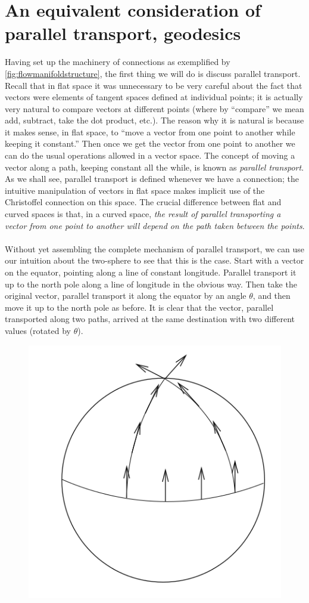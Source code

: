 \section{An equivalent consideration of parallel transport, geodesics}
Having set up the machinery of connections as exemplified by \ref{fig:flowmanifoldstructure}, the first thing we will do is discuss parallel
transport. Recall that in flat space it was unnecessary to be very careful about the fact
that vectors were elements of tangent spaces defined at individual points; it is actually very
natural to compare vectors at different points (where by “compare” we mean add, subtract,
take the dot product, etc.). The reason why it is natural is because it makes sense, in flat
space, to “move a vector from one point to another while keeping it constant.” Then once
we get the vector from one point to another we can do the usual operations allowed in a
vector space. The concept of moving a vector along a path, keeping constant all the while, is known
as \emph{parallel transport}. As we shall see, parallel transport is defined whenever we have a connection; the intuitive manipulation of vectors in flat space makes implicit use of the
Christoffel connection on this space. The crucial difference between flat and curved spaces is
that, in a curved space, \emph{the result of parallel transporting a vector from one point to another
	will depend on the path taken between the points}.\\
\\
Without yet assembling the complete
mechanism of parallel transport, we can use our intuition about the two-sphere to see that
this is the case. Start with a vector on the equator, pointing along a line of constant
longitude. Parallel transport it up to the north pole along a line of longitude in the obvious
way. Then take the original vector, parallel transport it along the equator by an angle $θ$, and
then move it up to the north pole as before. It is clear that the vector, parallel transported
along two paths, arrived at the same destination with two different values (rotated by $θ$).
\begin{figure}[h!]
	\centering
	\includegraphics[width=0.7\linewidth]{gfx/ParalleltransportTwosphere}
	\caption{}
	\label{fig:paralleltransporttwosphere}
\end{figure}

